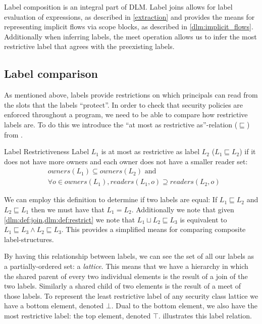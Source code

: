 Label composition is an integral part of DLM.
Label joins allows for label evaluation of expressions, as described in \cref{extraction} and provides the means for representing implicit flows via scope blocks, as described in \cref{dlm:implicit_flows}.
Additionally when inferring labels, the meet operation allows us to infer the most restrictive label that agrees with the preexisting labels.

\subsection{Label comparison}\label{dlm:comparison}
As mentioned above, labels provide restrictions on which principals can read from the slots that the labels ``protect''.
In order to check that security policies are enforced throughout a program, we need to be able to compare how restrictive labels are.
To do this we introduce the ``at most as restrictive as''-relation ($\sqsubseteq$) from \cite{myers1997}.

\begin{definition}{Label Restrictiveness}\label{dlm:def:restrict}
  Label $L_1$ is at most as restrictive as label $L_2$ ($L_1 \sqsubseteq L_2$) if it does not have more owners and each owner does not have a smaller reader set:
  \begin{align*}
    & owners(L_1) \subseteq owners(L_2) \text{ and} \\
    & \forall o \in owners(L_1) , readers(L_1, o) \supseteq readers(L_2, o)
  \end{align*}
\end{definition}

We can employ this definition to determine if two labels are equal:
If $L_1 \sqsubseteq L_2$ and $L_2 \sqsubseteq L_1$ then we must have that $L_1 = L_2$.
Additionally we note that given \cref{dlm:def:join,dlm:def:restrict} we note that $L_1 \sqcup L_2 \sqsubseteq L_3$ is equivalent to $L_1 \sqsubseteq L_3 \wedge L_2 \sqsubseteq L_3$.
This provides a simplified means for comparing composite label-structures.

By having this relationship between labels, we can see the set of all our labels as a partially-ordered set: a \emph{lattice}.
This means that we have a hierarchy in which the shared parent of every two individual elements is the result of a join of the two labels.
Similarly a shared child of two elements is the result of a meet of those labels.
To represent the least restrictive label of any security class lattice we have a bottom element, denoted $\bot$.
Dual to the bottom element, we also have the most restrictive label: the top element, denoted $\top$.
 illustrates this label relation.

